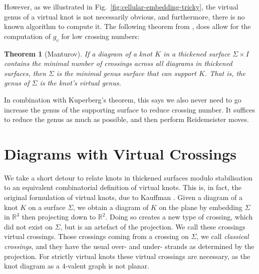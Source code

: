 \documentclass[12pt]{report}
\newcommand{\R}{\mathbb{R}}
\newtheorem*{theorem}{Theorem}
\begin{document}
However, as we illustrated in Fig.~\ref{fig:cellular-embedding-tricky}, the virtual genus of a virtual knot is not necessarily obvious, and furthermore, there is no known algorithm to compute it. The following theorem from \cite{parity-and-projection}, does allow for the computation of $g_{v}$ for low crossing numbers:

\begin{theorem}[Manturov]
	If a diagram of a knot $K$ in a thickened surface $\Sigma \times I$ contains the minimal number of crossings across all diagrams in thickened surfaces, then $\Sigma$ is the minimal genus surface that can support $K$. That is, the genus of $\Sigma$ is the knot's virtual genus.
\end{theorem}
In combination with Kuperberg's theorem, this says we also never need to go increase the genus of the supporting surface to reduce crossing number. It suffices to reduce the genus as much as possible, and then perform Reidemeister moves.


\section{Diagrams with Virtual Crossings}

We take a short detour to relate knots in thickened surfaces modulo stabilisation to an equivalent combinatorial definition of virtual knots. This is, in fact, the original formulation of virtual knots, due to Kauffman \cite{virtual-knot-theory}. Given a diagram of a knot $K$ on a surface $\Sigma$, we obtain a diagram of $K$ on the plane by embedding $\Sigma$ in $\R^{3}$ then projecting down to $\R^{2}$. Doing so creates a new type of crossing, which did not exist on $\Sigma$, but is an artefact of the projection. We call these crossings virtual crossings. Those crossings coming from a crossing on $\Sigma$, we call \textit{classical crossings}, and they have the usual over- and under- strands as determined by the projection. For strictly virtual knots these virtual crossings are necessary, as the knot diagram as a $4$-valent graph is not planar.
\end{document}
